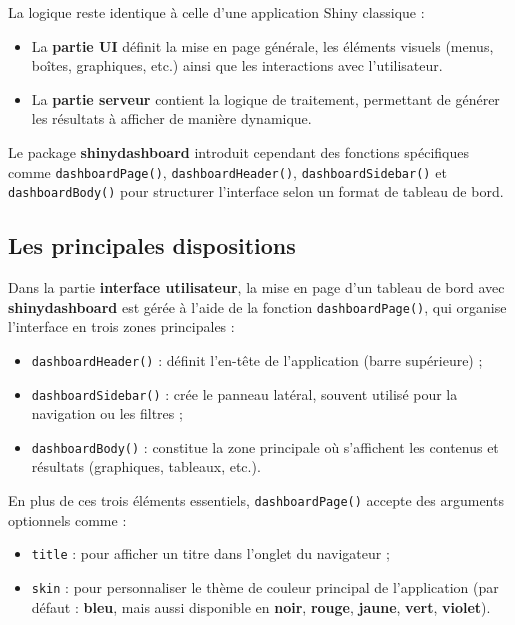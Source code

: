 \documentclass[
]{article}
\providecommand{\tightlist}{%
  \setlength{\itemsep}{0pt}\setlength{\parskip}{0pt}}
\begin{document}
La logique reste identique à celle d'une application Shiny classique :

\begin{itemize}
\tightlist
\item
  La \textbf{partie UI} définit la mise en page générale, les éléments
  visuels (menus, boîtes, graphiques, etc.) ainsi que les interactions
  avec l'utilisateur.
\item
  La \textbf{partie serveur} contient la logique de traitement,
  permettant de générer les résultats à afficher de manière dynamique.
\end{itemize}

Le package \textbf{shinydashboard} introduit cependant des fonctions
spécifiques comme \texttt{dashboardPage()}, \texttt{dashboardHeader()},
\texttt{dashboardSidebar()} et \texttt{dashboardBody()} pour structurer
l'interface selon un format de tableau de bord.

\subsection{Les principales
dispositions}\label{les-principales-dispositions}

Dans la partie \textbf{interface utilisateur}, la mise en page d'un
tableau de bord avec \textbf{shinydashboard} est gérée à l'aide de la
fonction \texttt{dashboardPage()}, qui organise l'interface en trois
zones principales :

\begin{itemize}
\tightlist
\item
  \texttt{dashboardHeader()} : définit l'en-tête de l'application (barre
  supérieure) ;
\item
  \texttt{dashboardSidebar()} : crée le panneau latéral, souvent utilisé
  pour la navigation ou les filtres ;
\item
  \texttt{dashboardBody()} : constitue la zone principale où s'affichent
  les contenus et résultats (graphiques, tableaux, etc.).
\end{itemize}

En plus de ces trois éléments essentiels, \texttt{dashboardPage()}
accepte des arguments optionnels comme :

\begin{itemize}
\tightlist
\item
  \texttt{title} : pour afficher un titre dans l'onglet du navigateur ;
\item
  \texttt{skin} : pour personnaliser le thème de couleur principal de
  l'application (par défaut : \textbf{bleu}, mais aussi disponible en
  \textbf{noir}, \textbf{rouge}, \textbf{jaune}, \textbf{vert},
  \textbf{violet}).
\end{itemize}
\end{document}
